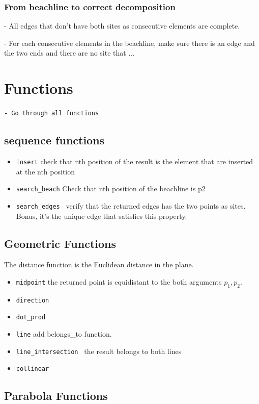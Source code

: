 \documentclass{article}
\begin{document}
\subsubsection{From beachline to correct decomposition}
- All edges that don't have both sites as consecutive elements are complete.


- For each consecutive elements in the beachline, make sure there is an edge and the two ends and there are no site that ...



\section{Functions}
{\color{red} \tt - Go through all functions}
\subsection{sequence functions}
\begin{itemize}
    \item {\tt insert} check that nth position of the result is the element that are inserted at the nth position
    \item {\tt search\_beach} Check that nth position of the beachline is p2
    \item {\tt search\_edges } verify that the returned edges has the two points as sites. Bonus, it's the unique edge that satisfies this property. 
    
\end{itemize}
\subsection{Geometric Functions}
The distance function is the Euclidean distance in the plane. 
\begin{itemize}
    \item {\tt midpoint} the returned point is equidistant to the both arguments $p_1, p_2$. 
    \item {\tt direction} 
    \item {\tt dot\_prod}
    \item {\tt line} add belongs\_to function.
    \item {\tt line\_intersection } the result belongs to both lines
    \item {\tt collinear} 
\end{itemize}

\subsection{Parabola Functions}
\end{document}
